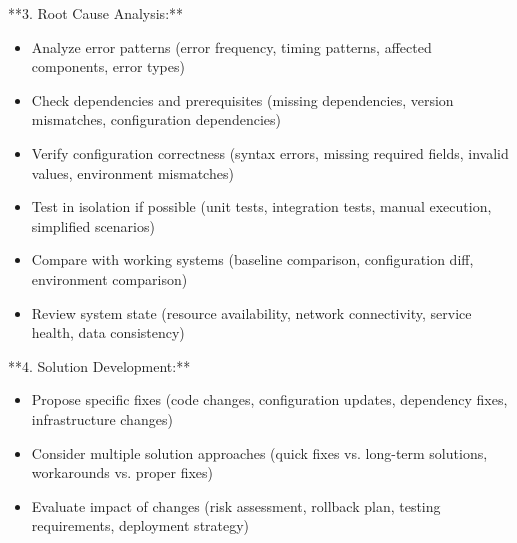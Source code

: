\documentclass[11pt,a4paper]{article}
\begin{document}
**3. Root Cause Analysis:**

\begin{itemize}
\item Analyze error patterns (error frequency, timing patterns, affected components, error types)
\end{itemize}

\begin{itemize}
\item Check dependencies and prerequisites (missing dependencies, version mismatches, configuration dependencies)
\end{itemize}

\begin{itemize}
\item Verify configuration correctness (syntax errors, missing required fields, invalid values, environment mismatches)
\end{itemize}

\begin{itemize}
\item Test in isolation if possible (unit tests, integration tests, manual execution, simplified scenarios)
\end{itemize}

\begin{itemize}
\item Compare with working systems (baseline comparison, configuration diff, environment comparison)
\end{itemize}

\begin{itemize}
\item Review system state (resource availability, network connectivity, service health, data consistency)
\end{itemize}

**4. Solution Development:**

\begin{itemize}
\item Propose specific fixes (code changes, configuration updates, dependency fixes, infrastructure changes)
\end{itemize}

\begin{itemize}
\item Consider multiple solution approaches (quick fixes vs. long-term solutions, workarounds vs. proper fixes)
\end{itemize}

\begin{itemize}
\item Evaluate impact of changes (risk assessment, rollback plan, testing requirements, deployment strategy)
\end{itemize}
\end{document}
